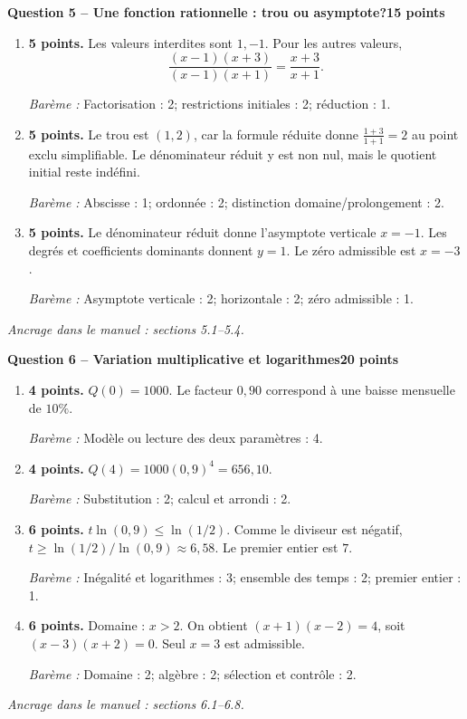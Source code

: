 \documentclass[11pt,a4paper]{article}
\begin{document}
\newpage
{\large\bfseries Question 5 -- Une fonction rationnelle : trou ou asymptote?}\hfill\textbf{15 points}\par
\begin{enumerate}
\item \textbf{5 points.} Les valeurs interdites sont \(1,-1\). Pour les autres valeurs, \[\frac{(x-1)(x+3)}{(x-1)(x+1)}=\frac{x+3}{x+1}.\]
\par{\small\textit{Barème : }Factorisation : 2; restrictions initiales : 2; réduction : 1.}
\item \textbf{5 points.} Le trou est \((1,2)\), car la formule réduite donne \(\frac{1+3}{1+1}=2\) au point exclu simplifiable. Le dénominateur réduit y est non nul, mais le quotient initial reste indéfini.
\par{\small\textit{Barème : }Abscisse : 1; ordonnée : 2; distinction domaine/prolongement : 2.}
\item \textbf{5 points.} Le dénominateur réduit donne l’asymptote verticale \(x=-1\). Les degrés et coefficients dominants donnent \(y=1\). Le zéro admissible est \(x=-3\).
\par{\small\textit{Barème : }Asymptote verticale : 2; horizontale : 2; zéro admissible : 1.}
\end{enumerate}
\vfill {\small\textit{Ancrage dans le manuel : sections 5.1--5.4.}}

\newpage
{\large\bfseries Question 6 -- Variation multiplicative et logarithmes}\hfill\textbf{20 points}\par
\begin{enumerate}
\item \textbf{4 points.} \(Q(0)=1000\). Le facteur \(0{,}90\) correspond à une baisse mensuelle de \(10\%\).
\par{\small\textit{Barème : }Modèle ou lecture des deux paramètres : 4.}
\item \textbf{4 points.} \(Q(4)=1000(0{,}9)^4=656{,}10\).
\par{\small\textit{Barème : }Substitution : 2; calcul et arrondi : 2.}
\item \textbf{6 points.} \(t\ln(0{,}9)\le\ln(1/2)\). Comme le diviseur est négatif, \(t\ge\ln(1/2)/\ln(0{,}9)\approx6{,}58\). Le premier entier est \(7\).
\par{\small\textit{Barème : }Inégalité et logarithmes : 3; ensemble des temps : 2; premier entier : 1.}
\item \textbf{6 points.} Domaine : \(x>2\). On obtient \((x+1)(x-2)=4\), soit \((x-3)(x+2)=0\). Seul \(x=3\) est admissible.
\par{\small\textit{Barème : }Domaine : 2; algèbre : 2; sélection et contrôle : 2.}
\end{enumerate}
\vfill {\small\textit{Ancrage dans le manuel : sections 6.1--6.8.}}
\end{document}

